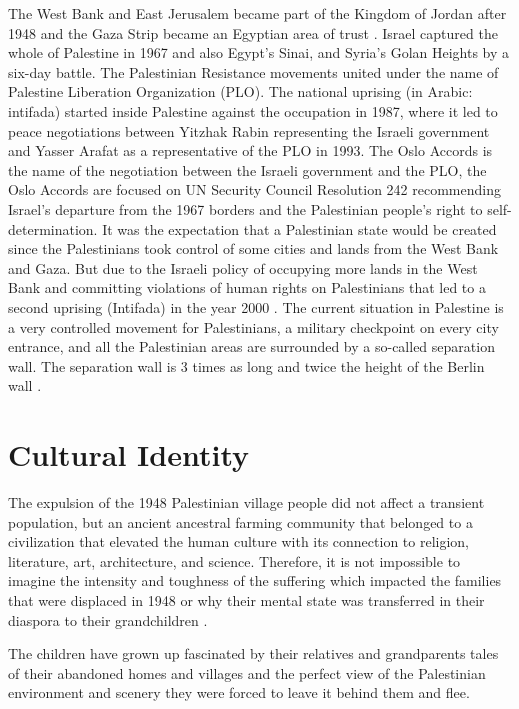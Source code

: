 The West Bank and East Jerusalem became part of the Kingdom of Jordan after 1948 and the Gaza Strip became an Egyptian area of trust \citep{Houdaille2010}. Israel captured the whole of Palestine in 1967 and also Egypt's Sinai, and Syria's Golan Heights by a six-day battle. The Palestinian Resistance movements united under the name of Palestine Liberation Organization (PLO). The national uprising (in Arabic: intifada) started inside Palestine against the occupation in 1987, where it led to peace negotiations between Yitzhak Rabin representing the Israeli government and Yasser Arafat as a representative of the PLO in 1993. The Oslo Accords is the name of the negotiation between the Israeli government and the PLO, the Oslo Accords are focused on UN Security Council Resolution 242 recommending Israel's departure from the 1967 borders and the Palestinian people's right to self-determination. It was the expectation that a Palestinian state would be created since the Palestinians took control of some cities and lands from the West Bank and Gaza. But due to the Israeli policy of occupying more lands in the West Bank and committing violations of human rights on Palestinians that led to a second uprising (Intifada) in the year 2000 \citep{Shalhoub-Kevorkian2006}. The current situation in Palestine is a very controlled movement for Palestinians, a military checkpoint on every city entrance, and all the Palestinian areas are surrounded by a so-called separation wall. The separation wall is 3 times as long and twice the height of the Berlin wall \citep{Shalhoub-Kevorkian2006}.



\section{Cultural Identity}
 
The expulsion of the 1948 Palestinian village people did not affect a transient population, but an ancient ancestral farming community that belonged to a civilization that elevated the human culture with its connection to religion, literature, art, architecture, and science. Therefore, it is not impossible to imagine the intensity and toughness of the suffering which impacted the families that were displaced in 1948 or why their mental state was transferred in their diaspora to their grandchildren \citep{Khalidi2015}.
 
 The children have grown up fascinated by their relatives and grandparents tales of their abandoned homes and villages and the perfect view of the Palestinian environment and scenery they were forced to leave it behind them and flee.

